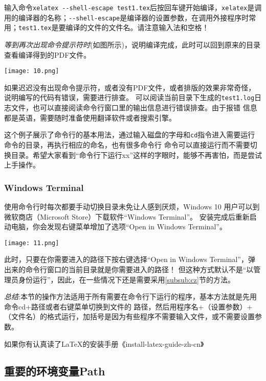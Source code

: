 输入命令\verb"xelatex --shell-escape test1.tex"后按回车键开始编译，\verb"xelatex"是调用的编译器的名称；\verb"--shell-escape"是编译器的设置参数，在调用外接程序时常用；\verb"test1.tex"是要编译的文件的文件名。请注意输入法和空格！

\emph{等到再次出现命令提示符时}(如图所示)，说明编译完成，此时可以回到原来的目录查看编译得到的PDF文件。
\begin{center}
  \texttt{[image: 10.png]}
\end{center}

如果迟迟没有出现命令提示符，或者没有PDF文件，或者排版的效果非常奇怪，说明编写的代码有错误，需要进行排查。
可以阅读当前目录下生成的\verb"test1.log"日志文件，也可以直接阅读命令行窗口里的输出信息进行错误排查。由于报错
信息都是英语，需要随时准备使用翻译软件或者搜索引擎。

这个例子展示了命令行的基本用法，通过输入磁盘的字母和\verb"cd"指令进入需要运行命令的目录，再执行相应的命名，也有很多命令行
命令可以直接运行而不需要切换目录。希望大家看到“命令行下运行xx”这样的字眼时，能够不再害怕，而是尝试上手操作。



\subsubsection{Windows Terminal}


使用命令行时每次都要手动切换目录未免让人感到厌烦，Windows 10 用户可以到微软商店（Microsoft Store）下载软件“Windows Terminal”。
安装完成后重新启动电脑，你会发现右键菜单增加了选项“Open in Windows Terminal”。

\begin{center}
  \texttt{[image: 11.png]}
\end{center}
此时，只要在你需要进入的路径下按右键选择“Open in Windows Terminal”，弹出来的命令行窗口的当前目录就是你需要进入的路径！
但这种方式默认不是“以管理员身份运行”，因此，在一些情况下还是需要采用\ref{subsub:cz}节的方法。

\emph{总结}:本节的操作方法适用于所有需要在命令行下运行的程序，基本方法就是先用命令cd+路径或者右键菜单切换到文件的
路径，然后用程序名+（设置参数）+（文件名）的格式运行，加括号是因为有些程序不需要输入文件，或不需要设置参数。

如果你有认真读了\LaTeX{}的安装手册《install-latex-guide-zh-cn》
\subsection{重要的环境变量Path}



